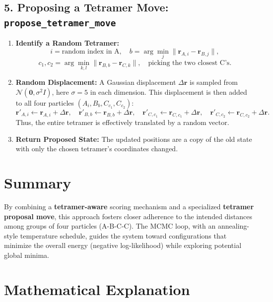 \documentclass[12pt]{article}
\begin{document}
\subsection*{5. Proposing a Tetramer Move: \texttt{propose\_tetramer\_move}}

\begin{enumerate}
    \item \textbf{Identify a Random Tetramer:}
    \[
      i = \text{random index in A}, \quad
      b = \arg\min_j \bigl\|\mathbf{r}_{A,i} - \mathbf{r}_{B,j}\bigr\|,
    \]
    \[
      c_1, c_2 = \arg\!\min_{k,l}\bigl\|\mathbf{r}_{B,b} - \mathbf{r}_{C,k}\bigr\|, \quad \text{picking the two closest C's}.
    \]
    \item \textbf{Random Displacement:} A Gaussian displacement \(\Delta \mathbf{r}\) is sampled from \(\mathcal{N}(\mathbf{0}, \sigma^2 I)\), here $\sigma=5$ in each dimension. This displacement is then added to all four particles $(A_i, B_b, C_{c_1}, C_{c_2})$:
    \[
      \mathbf{r}'_{A,i} \gets \mathbf{r}_{A,i} + \Delta \mathbf{r}, \quad
      \mathbf{r}'_{B,b} \gets \mathbf{r}_{B,b} + \Delta \mathbf{r}, \quad
      \mathbf{r}'_{C,c_1} \gets \mathbf{r}_{C,c_1} + \Delta \mathbf{r}, \quad
      \mathbf{r}'_{C,c_2} \gets \mathbf{r}_{C,c_2} + \Delta \mathbf{r}.
    \]
    Thus, the entire tetramer is effectively translated by a random vector.
    \item \textbf{Return Proposed State:} The updated positions are a copy of the old state with only the chosen tetramer's coordinates changed.
\end{enumerate}

\section*{Summary}

By combining a \textbf{tetramer-aware} scoring mechanism and a 
specialized \textbf{tetramer proposal move}, this approach fosters 
closer adherence to the intended distances among groups of four 
particles (A-B-C-C). The MCMC loop, with an annealing-style 
temperature schedule, guides the system toward configurations 
that minimize the overall energy (negative log-likelihood) while 
exploring potential global minima.

\section{Mathematical Explanation}
\end{document}
